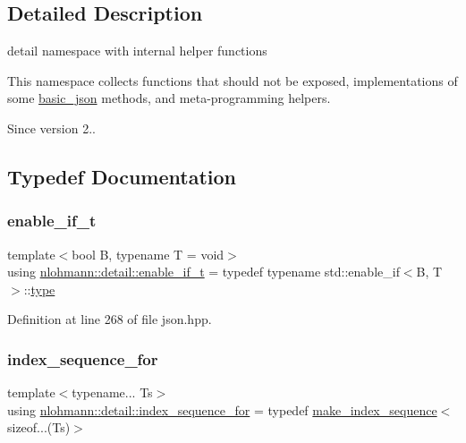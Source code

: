 \subsection{Detailed Description}
detail namespace with internal helper functions 

This namespace collects functions that should not be exposed, implementations of some \hyperlink{classnlohmann_1_1basic__json}{basic\+\_\+json} methods, and meta-\/programming helpers.

\begin{DoxySince}{Since}
version 2.. 
\end{DoxySince}


\subsection{Typedef Documentation}
\mbox{\label{namespacenlohmann_1_1detail_a02bcbc878bee413f25b985ada771aa9c}} 
\subsubsection{\texorpdfstring{enable\+\_\+if\+\_\+t}{enable\_if\_t}}
{\footnotesize\ttfamily template$<$bool B, typename T  = void$>$ \\
using \hyperlink{namespacenlohmann_1_1detail_a02bcbc878bee413f25b985ada771aa9c}{nlohmann\+::detail\+::enable\+\_\+if\+\_\+t} = typedef typename std\+::enable\+\_\+if$<$B, T$>$\+::\hyperlink{classstd_1_1conditional_1_1type}{type}}



Definition at line 268 of file json.\+hpp.

\mbox{\label{namespacenlohmann_1_1detail_a24800493c6ec02ce033dcbb47b7fd28e}} 
\subsubsection{\texorpdfstring{index\+\_\+sequence\+\_\+for}{index\_sequence\_for}}
{\footnotesize\ttfamily template$<$typename... Ts$>$ \\
using \hyperlink{namespacenlohmann_1_1detail_a24800493c6ec02ce033dcbb47b7fd28e}{nlohmann\+::detail\+::index\+\_\+sequence\+\_\+for} = typedef \hyperlink{structnlohmann_1_1detail_1_1make__index__sequence}{make\+\_\+index\+\_\+sequence}$<$sizeof...(Ts)$>$}



